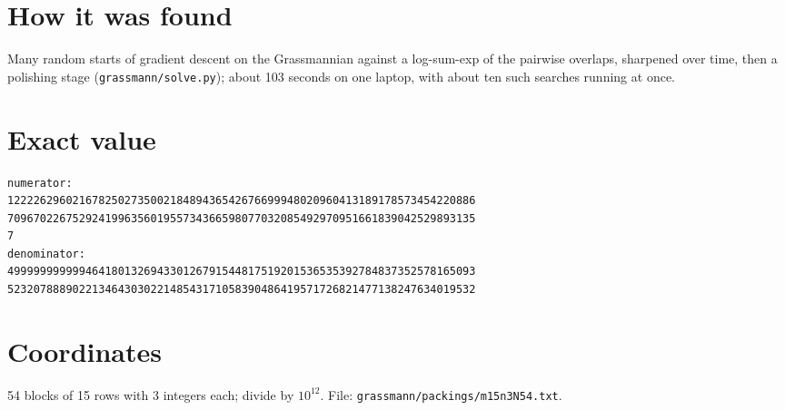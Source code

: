 \documentclass[11pt,a4paper]{article}
\begin{document}
\section{How it was found}
Many random starts of gradient descent on the Grassmannian against a log-sum-exp of the pairwise overlaps, sharpened over time, then a polishing stage (\texttt{grassmann/solve.py}); about 103 seconds on one laptop, with about ten such searches running at once.


\appendix
\section{Exact value}
{\small
\begin{verbatim}
numerator:
122226296021678250273500218489436542676699948020960413189178573454220886
709670226752924199635601955734366598077032085492970951661839042529893135
7
denominator:
499999999999464180132694330126791544817519201536535392784837352578165093
523207888902213464303022148543171058390486419571726821477138247634019532
\end{verbatim}}

\section{Coordinates}
54 blocks of 15 rows with 3 integers each; divide by $10^{12}$. File: \texttt{grassmann/packings/m15n3N54.txt}.
{\tiny
\begin{multicols}{3}
\end{multicols}}
\end{document}
